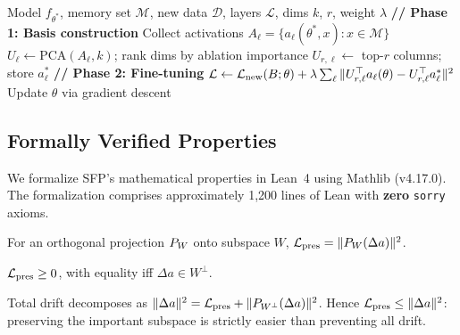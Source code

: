 \begin{algorithm}[t]
\caption{Subspace Feature Preservation}
\label{alg:sfp}
\begin{algorithmic}[1]
\REQUIRE Model $f_{\theta^*}$, memory set $\mathcal{M}$, new data $\mathcal{D}$, layers $\mathcal{L}$, dims $k$, $r$, weight $\lambda$
\STATE \textbf{// Phase 1: Basis construction}
    \STATE Collect activations $A_\ell = \{a_\ell(\theta^*, x) : x \in \mathcal{M}\}$
    \STATE $U_\ell \leftarrow \text{PCA}(A_\ell, k)$; rank dims by ablation importance
    \STATE $U_{r,\ell} \leftarrow$ top-$r$ columns; store $a_\ell^*$
\ENDFOR
\STATE \textbf{// Phase 2: Fine-tuning}
    \STATE $\mathcal{L} \leftarrow \mathcal{L}_{\text{new}}(B; \theta) + \lambda \sum_\ell \| U_{r,\ell}^\top a_\ell(\theta) - U_{r,\ell}^\top a_\ell^* \|^2$
    \STATE Update $\theta$ via gradient descent
\ENDFOR
\end{algorithmic}
\end{algorithm}

\subsection{Formally Verified Properties}
\label{sec:formal}

We formalize SFP's mathematical properties in Lean~4 using Mathlib (v4.17.0).
The formalization comprises approximately 1{,}200 lines of Lean with \textbf{zero} \texttt{sorry} axioms.

\begin{definition}
\label{def:pres_loss}
For an orthogonal projection $P_W$ onto subspace $W$,
$\mathcal{L}_{\text{pres}} = \| P_W(\Delta a) \|^2$.
\end{definition}

\begin{proposition}
\label{prop:loss_props}
$\mathcal{L}_{\text{pres}} \geq 0$, with equality iff $\Delta a \in W^\perp$.
\end{proposition}

\begin{proposition}
\label{prop:pythag}
Total drift decomposes as
$\| \Delta a \|^2 = \mathcal{L}_{\text{pres}} + \| P_{W^\perp}(\Delta a) \|^2$.
Hence $\mathcal{L}_{\text{pres}} \leq \| \Delta a \|^2$: preserving the important subspace is strictly easier than preventing all drift.
\end{proposition}

